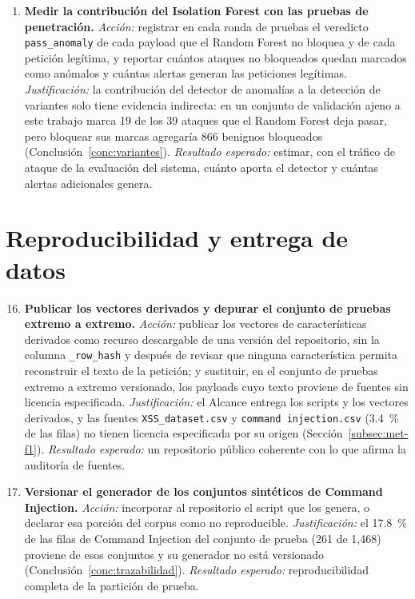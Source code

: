 \begin{enumerate}
    \item \textbf{Medir la contribución del Isolation Forest con las pruebas de penetración.}
    \textit{Acción:} registrar en cada ronda de pruebas el veredicto \texttt{pass\_anomaly} de cada
    payload que el Random Forest no bloquea y de cada petición legítima, y reportar cuántos
    ataques no bloqueados quedan marcados como anómalos y cuántas alertas generan las peticiones
    legítimas. \textit{Justificación:} la contribución del detector de anomalías a la detección de
    variantes solo tiene evidencia indirecta: en un conjunto de validación ajeno a este trabajo marca
    19 de los 39 ataques que el Random Forest deja pasar, pero bloquear sus marcas agregaría 866
    benignos bloqueados \cite{valenzuela2026ia} (Conclusión~\ref{conc:variantes}).
    \textit{Resultado esperado:} estimar, con el tráfico de ataque de la evaluación del sistema,
    cuánto aporta el detector y cuántas alertas adicionales genera.
\end{enumerate}

\section{Reproducibilidad y entrega de datos}

\begin{enumerate}
    \setcounter{enumi}{15}
    \item \textbf{Publicar los vectores derivados y depurar el conjunto de pruebas extremo a
    extremo.} \textit{Acción:} publicar los vectores de características derivados como recurso
    descargable de una versión del repositorio, sin la columna \texttt{\_row\_hash} y después de
    revisar que ninguna característica permita reconstruir el texto de la petición; y sustituir, en
    el conjunto de pruebas extremo a extremo versionado, los payloads cuyo texto proviene de
    fuentes sin licencia especificada. \textit{Justificación:} el Alcance entrega los scripts y los
    vectores derivados, y las fuentes \texttt{XSS\_dataset.csv} y \texttt{command injection.csv}
    (3.4~\% de las filas) no tienen licencia especificada por su origen
    (Sección~\ref{subsec:met-f1}). \textit{Resultado esperado:} un repositorio público coherente
    con lo que afirma la auditoría de fuentes.

    \item \textbf{Versionar el generador de los conjuntos sintéticos de Command Injection.}
    \textit{Acción:} incorporar al repositorio el script que los genera, o declarar esa porción del
    corpus como no reproducible. \textit{Justificación:} el 17.8~\% de las filas de Command
    Injection del conjunto de prueba (261 de 1{,}468) proviene de esos conjuntos y su generador no
    está versionado (Conclusión~\ref{conc:trazabilidad}). \textit{Resultado esperado:}
    reproducibilidad completa de la partición de prueba.
\end{enumerate}

